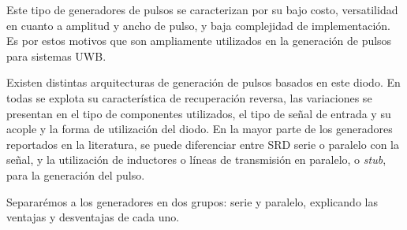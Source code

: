 Este tipo de generadores de pulsos se caracterizan por su bajo costo,
versatilidad en cuanto a amplitud y ancho de pulso, y baja complejidad de
implementación. Es por estos motivos que son ampliamente utilizados en la
generación de pulsos para sistemas UWB.

Existen distintas arquitecturas de generación de pulsos basados en este diodo.
En todas se explota su característica de recuperación reversa, las variaciones
se presentan en el tipo de componentes utilizados, el tipo de señal de entrada y
su acople y la forma de utilización del diodo. En la mayor parte de los
generadores reportados en la literatura, se puede diferenciar entre SRD serie o
paralelo con la señal, y la utilización de inductores o líneas de transmisión en
paralelo, o \textit{stub}, para la generación del pulso.

Separarémos a los generadores en dos grupos: serie y paralelo, explicando las
ventajas y desventajas de cada uno.

